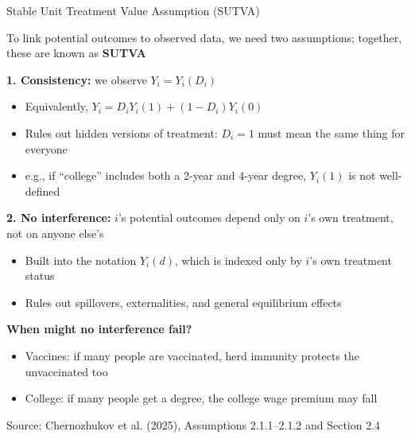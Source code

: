 \documentclass[compress, 8pt]{beamer}
\begin{document}
\begin{frame}{Stable Unit Treatment Value Assumption (SUTVA)}

To link potential outcomes to observed data, we need two assumptions; together, these are known as \textbf{SUTVA}

\vspace{2ex}
\textbf{1. Consistency:} we observe $Y_i = Y_i(D_i)$
\begin{itemize}
    \item Equivalently, $Y_i = D_i Y_i(1) + (1 - D_i) Y_i(0)$
    \item Rules out hidden versions of treatment: $D_i = 1$ must mean the same thing for everyone
    \item e.g., if ``college'' includes both a 2-year and 4-year degree, $Y_i(1)$ is not well-defined
\end{itemize}

\pause
\vspace{2ex}
\textbf{2. No interference:} $i$'s potential outcomes depend only on $i$'s own treatment, not on anyone else's
\begin{itemize}
    \item Built into the notation $Y_i(d)$, which is indexed only by $i$'s own treatment status
    \item Rules out spillovers, externalities, and general equilibrium effects
\end{itemize}

\pause
\vspace{2ex}
\textbf{When might no interference fail?}
\begin{itemize}
    \item Vaccines: if many people are vaccinated, herd immunity protects the unvaccinated too
    \item College: if many people get a degree, the college wage premium may fall
\end{itemize}

\vspace{2ex}
{\footnotesize Source: Chernozhukov et al. (2025), Assumptions 2.1.1--2.1.2 and Section 2.4}
\end{frame}
\end{document}
